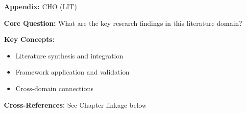 
\begin{tcolorbox}[colback=blue!5!white, colframe=blue!75!black,
    title=Quick Reference: Appendix UNMAPPED_CHO]
\textbf{Appendix:} CHO (LIT)

\textbf{Core Question:} What are the key research findings in this literature domain?

\textbf{Key Concepts:}
\begin{itemize}[nosep]
\item Literature synthesis and integration
\item Framework application and validation
\item Cross-domain connections
\end{itemize}

\textbf{Cross-References:} See Chapter linkage below
\end{tcolorbox}


\begin{abstract}
This appendix provides a systematic review and integration of key research findings
in the LIT domain. It synthesizes literature relevant to the Evidence-Based
Framework (EBF) and identifies connections to the 10C CORE architecture.
\end{abstract}


